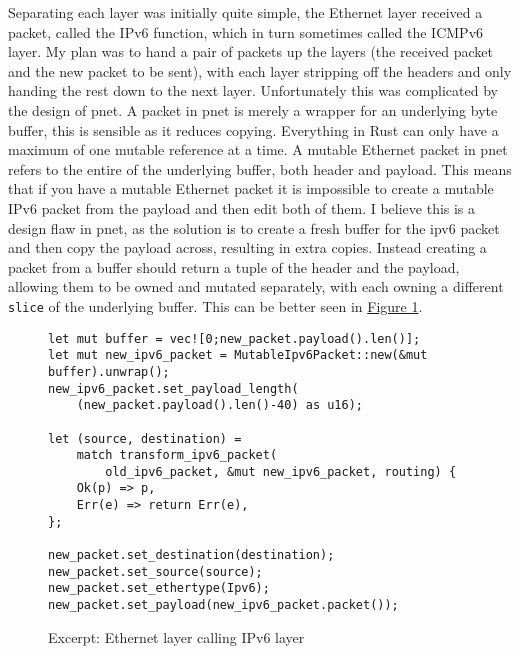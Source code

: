 \documentclass[12pt,a4paper,twoside,openright]{report}
\begin{document}
\bigskip

Separating each layer was initially quite simple, the Ethernet layer received a packet, called the IPv6 function, which in turn sometimes called the ICMPv6 layer.  My plan was to hand a pair of packets up the layers (the received packet and the new packet to be sent), with each layer stripping off the headers and only handing the rest down to the next layer.  Unfortunately this was complicated by the design of pnet.  A packet in pnet is merely a wrapper for an underlying byte buffer, this is sensible as it reduces copying.  Everything in Rust can only have a maximum of one mutable reference at a time.  A mutable Ethernet packet in pnet refers to the entire of the underlying buffer, both header and payload.  This means that if you have a mutable Ethernet packet it is impossible to create a mutable IPv6 packet from the payload and then edit both of them.  I believe this is a design flaw in pnet, as the solution is to create a fresh buffer for the ipv6 packet and then copy the payload across, resulting in extra copies. Instead creating a packet from a buffer should return a tuple of the header and the payload, allowing them to be owned and mutated separately, with each owning a different \verb!slice! of the underlying buffer. This can be better seen in  \hyperref[fig::mutability]{Figure }\ref{fig::mutability}.

\begin{figure}
\centering
\begin{varwidth}{\linewidth}
\begin{verbatim}
let mut buffer = vec![0;new_packet.payload().len()];
let mut new_ipv6_packet = MutableIpv6Packet::new(&mut buffer).unwrap();
new_ipv6_packet.set_payload_length(
    (new_packet.payload().len()-40) as u16);

let (source, destination) = 
    match transform_ipv6_packet(
        old_ipv6_packet, &mut new_ipv6_packet, routing) {
    Ok(p) => p,
    Err(e) => return Err(e),
};

new_packet.set_destination(destination);
new_packet.set_source(source);
new_packet.set_ethertype(Ipv6);
new_packet.set_payload(new_ipv6_packet.packet());
\end{verbatim}
\end{varwidth}
\caption{Excerpt: Ethernet layer calling IPv6 layer}
\label{fig::mutability}
\end{figure}

\bigskip
\end{document}
